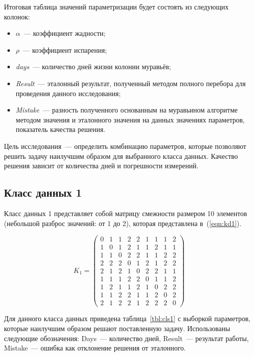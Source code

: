 Итоговая таблица значений параметризации будет состоять из следующих колонок:
\begin{itemize}
	\item $\alpha$~--- коэффициент жадности;
	\item $\rho$~--- коэффициент испарения;
	\item \textit{days}~--- количество дней жизни колонии муравьёв;
	\item \textit{Result}~--- эталонный результат, полученный методом полного перебора для проведения данного исследования;
	\item \textit{Mistake}~--- разность полученного основанным на муравьином алгоритме методом значения и эталонного значения на данных значениях параметров, показатель качества решения.
\end{itemize}

Цель исследования~--- определить комбинацию параметров, которые позволяют решить задачу наилучшим образом для выбранного класса данных.
Качество решения зависит от количества дней и погрешности измерений.

\subsection{Класс данных 1}
\label{par:class1}

Класс данных 1 представляет собой матрицу смежности размером 10 элементов (небольшой разброс значений: от 1 до 2), которая представлена в~(\ref{eqn:kd1}).

\begin{equation}
	\label{eqn:kd1}
	K_{1} = \begin{pmatrix}
		0 & 1 & 1 & 2 & 2 & 1 & 1 & 1 & 2 \\ 
		1 & 0 & 1 & 2 & 1 & 1 & 2 & 1 & 1 \\ 
		1 & 1 & 0 & 2 & 2 & 1 & 1 & 2 & 2 \\ 
		2 & 2 & 2 & 0 & 1 & 2 & 1 & 2 & 2 \\ 
		2 & 1 & 2 & 1 & 0 & 2 & 2 & 1 & 1 \\ 
		1 & 1 & 1 & 2 & 2 & 0 & 1 & 1 & 2 \\ 
		1 & 2 & 1 & 1 & 2 & 1 & 0 & 2 & 2 \\ 
		1 & 1 & 2 & 2 & 1 & 1 & 2 & 0 & 2 \\ 
		2 & 1 & 2 & 2 & 1 & 2 & 2 & 2 & 0 
	\end{pmatrix}
\end{equation}

Для данного класса данных приведена таблица~\ref{tbl:cls1} с выборкой параметров, которые наилучшим образом решают поставленную задачу. Использованы следующие обозначения: Days~--- количество дней, Result~--- результат работы, Mistake~--- ошибка как отклонение решения от эталонного.

